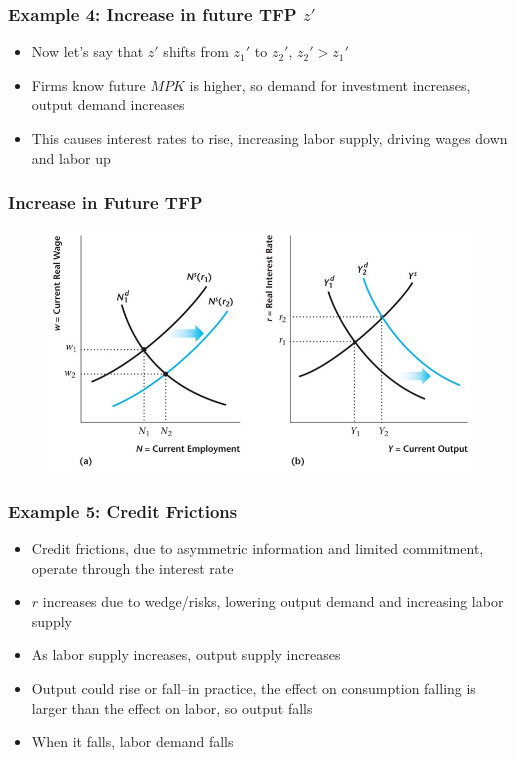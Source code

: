 \documentclass{beamer}
\begin{document}
\begin{frame}
\frametitle[alignment=center]{Example 4: Increase in future TFP $z'$} 
\begin{itemize}
\item Now let's say that $z'$ shifts from  $z_1'$ to $z_2'$, $z_2'>z_1'$
\bigskip
\item Firms know future $MPK$ is higher, so demand for investment increases, output demand increases
\bigskip
\item This causes interest rates to rise, increasing labor supply, driving wages down and labor up
\end{itemize}
\end{frame}

\begin{frame} 
\frametitle[alignment=center]{Increase in Future TFP} 
\begin{figure}
\centering
\includegraphics[scale=0.52]{Figures/W_Fig_11pt27.png}
\end{figure}
\end{frame}


\begin{frame}
\frametitle[alignment=center]{Example 5: Credit Frictions} 
\begin{itemize}
\item Credit frictions, due to asymmetric information and limited commitment, operate through the interest rate
\bigskip
\item $r$ increases due to wedge/risks, lowering output demand and increasing labor supply
\bigskip
\item As labor supply increases, output supply increases
\bigskip
\item Output could rise or fall--in practice, the effect on consumption falling is larger than the effect on labor, so output falls
\bigskip
\item When it falls, labor demand falls
\end{itemize}
\end{frame}
\end{document}
